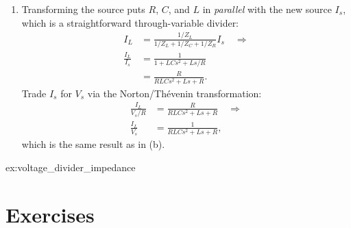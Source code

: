 \documentclass[dynamic_systems.tex]{subfiles}
\begin{document}
{\begin{enumerate}[label={\alph*.}]
\begin{align*}
				\frac{I_L}{V_s} &= \frac{1}{R L C s^2 + L s + R}
			\end{align*}
		\item
			Transforming the source puts $R$, $C$, and $L$ in \emph{parallel} with the new source $I_s$, which is a straightforward through-variable divider:
			\begin{align*}
				I_L &= \frac{1/Z_L}{1/Z_L + 1/Z_C + 1/Z_R} I_s \quad \Rightarrow \\
				\frac{I_L}{I_s} &= \frac{1}{1+ L C s^2 + L s/R} \\
				&= \frac{R}{R L C s^2 + L s + R}.
			\end{align*}
			Trade $I_s$ for $V_s$ via the Norton/Th\'evenin transformation:
			\begin{align*}
				\frac{I_L}{V_s/R} &= \frac{R}{R L C s^2 + L s + R} \quad \Rightarrow \\
				\frac{I_L}{V_s} &= \frac{1}{R L C s^2 + L s + R},
			\end{align*}
			which is the same result as in (b).
\end{enumerate}
}{%
ex:voltage_divider_impedance%
}



\section*{Exercises}








\end{document}
